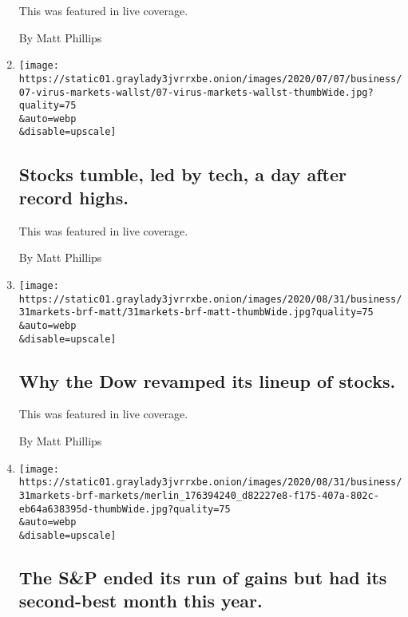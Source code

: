 \begin{enumerate}
  This was featured in live coverage.

  By Matt Phillips
\item
  \href{/live/2020/09/03/business/stock-market-today-coronavirus/stocks-tumble-led-by-tech-a-day-after-record-highs}{}

  \texttt{[image: https://static01.graylady3jvrrxbe.onion/images/2020/07/07/business/07-virus-markets-wallst/07-virus-markets-wallst-thumbWide.jpg?quality=75\\\&auto=webp\\\&disable=upscale]}

  \hypertarget{stocks-tumble-led-by-tech-a-day-after-record-highs}{%
  \subsection{Stocks tumble, led by tech, a day after record
  highs.}\label{stocks-tumble-led-by-tech-a-day-after-record-highs}}

  This was featured in live coverage.

  By Matt Phillips
\item
  \href{/live/2020/08/31/business/stock-market-today-coronavirus/why-the-dow-revamped-its-lineup-of-stocks}{}

  \texttt{[image: https://static01.graylady3jvrrxbe.onion/images/2020/08/31/business/31markets-brf-matt/31markets-brf-matt-thumbWide.jpg?quality=75\\\&auto=webp\\\&disable=upscale]}

  \hypertarget{why-the-dow-revamped-its-lineup-of-stocks}{%
  \subsection{Why the Dow revamped its lineup of
  stocks.}\label{why-the-dow-revamped-its-lineup-of-stocks}}

  This was featured in live coverage.

  By Matt Phillips
\item
  \href{/live/2020/08/31/business/stock-market-today-coronavirus/the-sp-ended-its-run-of-gains-but-had-its-second-best-month-this-year}{}

  \texttt{[image: https://static01.graylady3jvrrxbe.onion/images/2020/08/31/business/31markets-brf-markets/merlin\_176394240\_d82227e8-f175-407a-802c-eb64a638395d-thumbWide.jpg?quality=75\\\&auto=webp\\\&disable=upscale]}

  \hypertarget{the-sp-ended-its-run-of-gains-but-had-its-second-best-month-this-year}{%
  \subsection{The S\&P ended its run of gains but had its second-best
  month this
  year.}\label{the-sp-ended-its-run-of-gains-but-had-its-second-best-month-this-year}}


\end{enumerate}
